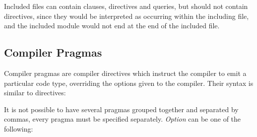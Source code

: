 Included files can contain clauses, directives and queries, but should
not contain  directives, since they would be interpreted as
occurring within the including file, and the included module would
not end at the end of the included file.


\subsection{Compiler Pragmas}
Compiler pragmas are compiler directives which instruct the compiler
to emit a particular code type, overriding the options given to the compiler.
Their syntax is similar to directives:
\begin{quote}
\end{quote}
It is not possible to have several pragmas grouped together and separated
by commas, every pragma must be specified separately.
{\it Option} can be one of the following:
